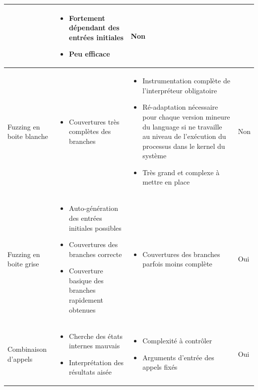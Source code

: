 \documentclass[a4paper]{report}
\begin{document}
\begin{landscape}
\begin{tabularx}{1\linewidth}{>{\centering}p{}||p{}|p{}|p{}}
	 & 
	\begin{itemize}
	\item Fortement dépendant des entrées initiales
	\item Peu efficace
	\end{itemize}
	 & Non \\ 
	\hline   
	Fuzzing en boite blanche & 
	\begin{itemize}
	\item Couvertures très complètes des branches
	\end{itemize}
	 & 
	\begin{itemize}
	\item Instrumentation complète de l'interpréteur obligatoire
	\item Ré-adaptation nécessaire pour chaque version mineure du language si ne travaille au niveau de l'exécution du processus dans le kernel du système
	\item Très grand et complexe à mettre en place 
	\end{itemize}
	 & Non \\ 
	\hline   
	Fuzzing en boite grise & 
	\begin{itemize}
	\item Auto-génération des entrées initiales possibles
	\item Couvertures des branches correcte
	\item Couverture basique des branches rapidement obtenues
	\end{itemize}
	 & 
	\begin{itemize}
	\item Couvertures des branches parfois moins complète
	\end{itemize}
	 & Oui \\ 
	\hline   
	Combinaison d'appels & 
	\begin{itemize}
	\item Cherche des états internes mauvais
	\item  Interprétation des résultats aisée
	\end{itemize}
	 & 
	\begin{itemize}
	\item Complexité à contrôler
	\item Arguments d'entrée des appels fixés
	\end{itemize}
	 & Oui \\ 
	\hline 
	\end{tabularx}
\end{landscape}
\restoregeometry 
\end{document}
